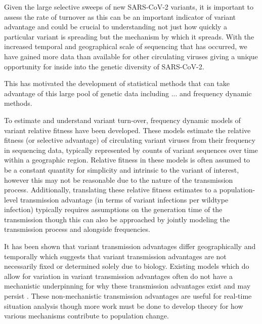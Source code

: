 \documentclass[12pt,oneside,letterpaper]{article}
\begin{document}
Given the large selective sweeps of new SARS-CoV-2 variants, it is important to assess the rate of turnover as this can be an important indicator of variant advantage and could be crucial to understanding not just how quickly a particular variant is spreading but the mechanism by which it spreads.
With the increased temporal and geographical scale of sequencing that has occurred, we have gained more data than available for other circulating viruses giving a unique opportunity for inside into the genetic diversity of SARS-CoV-2.

This has motivated the development of statistical methods that can take advantage of this large pool of genetic data including ... and frequency dynamic methods.

To estimate and understand variant turn-over, frequency dynamic models of variant relative fitness have been developed.
These models estimate the relative fitness (or selective advantage) of circulating variant viruses from their frequency in sequencing data, typically represented by counts of variant sequences over time within a geographic region.
Relative fitness in these models is often assumed to be a constant quantity for simplicity and intrinsic to the variant of interest, however this may not be reasonable due to the nature of the transmission process.
Additionally, translating these relative fitness estimates to a population-level transmission advantage (in terms of variant infections per wildtype infection) typically requires assumptions on the generation time of the transmission though this can also be approached by jointly modeling the transmission process and alongside frequencies.  \cite{figgins2022sars, Wallinga2006}

It has been shown that variant transmission advantages differ geographically and temporally which suggests that variant transmission advantages are not necessarily fixed or determined solely due to biology.
Existing models which do allow for variation in variant transmission advantages often do not have a mechanistic underpinning for why these transmission advantages exist and may persist \cite{figgins2022sars, susswein2023leveraging}.
These non-mechanistic transmission advantages are useful for real-time situation analysis though more work must be done to develop theory for how various mechanisms contribute to population change.
\end{document}
